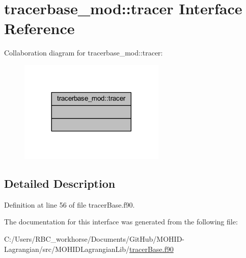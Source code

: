 \hypertarget{interfacetracerbase__mod_1_1tracer}{}\section{tracerbase\+\_\+mod\+:\+:tracer Interface Reference}
\label{interfacetracerbase__mod_1_1tracer}


Collaboration diagram for tracerbase\+\_\+mod\+:\+:tracer\+:\nopagebreak
\begin{figure}[H]
\begin{center}
\leavevmode
\includegraphics[width=197pt]{interfacetracerbase__mod_1_1tracer__coll__graph}
\end{center}
\end{figure}


\subsection{Detailed Description}


Definition at line 56 of file tracer\+Base.\+f90.



The documentation for this interface was generated from the following file\+:\begin{DoxyCompactItemize}
\item 
C\+:/\+Users/\+R\+B\+C\+\_\+workhorse/\+Documents/\+Git\+Hub/\+M\+O\+H\+I\+D-\/\+Lagrangian/src/\+M\+O\+H\+I\+D\+Lagrangian\+Lib/\mbox{\hyperlink{tracer_base_8f90}{tracer\+Base.\+f90}}\end{DoxyCompactItemize}
